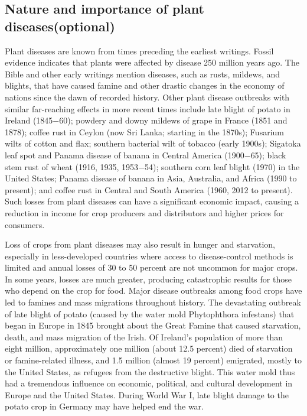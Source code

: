 \documentclass[a4paper,12pt]{article}
\begin{document}
 
 
 
 
\subsection{Nature and importance of plant diseases(optional)}
Plant diseases are known from times preceding the earliest writings. Fossil evidence indicates that plants were affected by disease 250 million years ago. The Bible and other early writings mention diseases, such as rusts, mildews, and blights, that have caused famine and other drastic changes in the economy of nations since the dawn of recorded history. Other plant disease outbreaks with similar far-reaching effects in more recent times include late blight of potato in Ireland (1845$-$60); powdery and downy mildews of grape in France (1851 and 1878); coffee rust in Ceylon (now Sri Lanka; starting in the 1870s); Fusarium wilts of cotton and flax; southern bacterial wilt of tobacco (early 1900s); Sigatoka leaf spot and Panama disease of banana in Central America (1900$-$65); black stem rust of wheat (1916, 1935, 1953$-$54); southern corn leaf blight (1970) in the United States; Panama disease of banana in Asia, Australia, and Africa (1990 to present); and coffee rust in Central and South America (1960, 2012 to present). Such losses from plant diseases can have a significant economic impact, causing a reduction in income for crop producers and distributors and higher prices for consumers.

Loss of crops from plant diseases may also result in hunger and starvation, especially in less-developed countries where access to disease-control methods is limited and annual losses of 30 to 50 percent are not uncommon for major crops. In some years, losses are much greater, producing catastrophic results for those who depend on the crop for food. Major disease outbreaks among food crops have led to famines and mass migrations throughout history. The devastating outbreak of late blight of potato (caused by the water mold Phytophthora infestans) that began in Europe in 1845 brought about the Great Famine that caused starvation, death, and mass migration of the Irish. Of Ireland’s population of more than eight million, approximately one million (about 12.5 percent) died of starvation or famine-related illness, and 1.5 million (almost 19 percent) emigrated, mostly to the United States, as refugees from the destructive blight. This water mold thus had a tremendous influence on economic, political, and cultural development in Europe and the United States. During World War I, late blight damage to the potato crop in Germany may have helped end the war.
\end{document}
